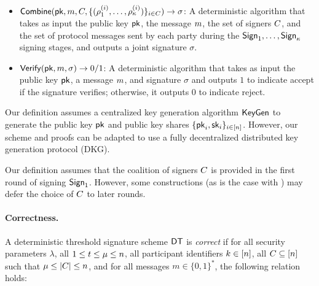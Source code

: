 \begin{definition}
\begin{itemize}
  \item $\mathsf{Combine}(\mathsf{pk}, m, C, \{(\rho^{(i)}_1, \ldots, \rho^{(i)}_\kappa) \}_{i \in C}) \rightarrow \sigma$:
  A deterministic algorithm that takes as input the public key $\mathsf{pk}$, the message
    $m$, the set of signers $C$, and the set of protocol messages
  sent by each party during the $\mathsf{Sign}_1, \ldots, \mathsf{Sign}_\kappa$ signing stages, and outputs a joint signature $\sigma$.

  \item $\mathsf{Verify}(\mathsf{pk}, m, \sigma) \rightarrow 0/1$:
A deterministic algorithm that takes as input the public key $\mathsf{pk}$,
a message $m$,
and signature $\sigma$ and outputs $1$ to indicate accept if the signature verifies;
otherwise, it outputs $0$ to indicate reject.
\end{itemize}
\end{definition}

\begin{remark}\label{rmk:dkg}
  Our definition assumes a centralized key generation algorithm $\mathsf{KeyGen}$ to
  generate the public key $\mathsf{pk}$ and public key shares $\{ \mathsf{pk}_i, \mathsf{sk}_i \}_{i \in [n]}$.
  However, our scheme and proofs can be adapted to use a fully decentralized distributed key generation protocol (DKG).
\end{remark}

\begin{remark}
  Our definition assumes that the coalition of signers $C$ is provided in the first round of signing $\mathsf{Sign}_1$.
  However, some constructions (as is the case with \glitter) may defer the choice of $C$ to later rounds.
\end{remark}

\paragraph{Correctness.} A deterministic threshold signature scheme $\mathsf{DT}$ is \emph{correct} if for all security parameters $\lambda$,
all $1 \leq t \leq \mu \leq n$,
all participant identifiers $k \in [n]$,
all $C \subseteq [n]$ such that $\mu \leq | C | \leq n$,
and for all messages $m \in \{0,1\}^*$,
the following relation holds:

